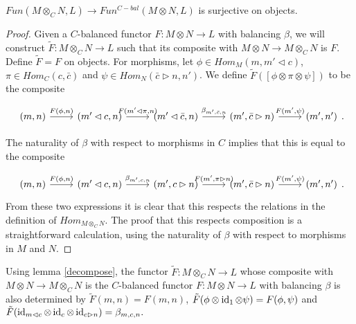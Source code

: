 \begin{lemma}\label{surjective}
  $Fun(M\otimes_C N,L)\to Fun^{C-bal}(M\otimes N,L)$ is surjective on
  objects.
\end{lemma}

\begin{proof}
  Given a $C$-balanced functor $F:M\otimes N \to L$ with balancing $\beta$, we
  will construct $\tilde{F}:M\otimes_C N \to L$ such that its composite with
  $M\otimes N\to M\otimes_C N$ is $F$. Define $\tilde{F} = F$ on objects.
  For morphisms, let $\phi\in Hom_M(m,m'\lhd c)$, $\pi\in Hom_C(c,\bar{c})$
  and $\psi\in Hom_N(\bar{c}\rhd n,n')$. We define
  $\tilde{F}([\phi\otimes\pi\otimes\psi])$ to be the composite

  \[
    \begin{tikzcd}
      {(m,n)} & {(m'\lhd c,n)} & {(m'\lhd \bar{c},n)} & {(m',\bar{c}\rhd n)} & {(m',n')}
      \arrow["{F(\phi,n)}", from=1-1, to=1-2]
      \arrow["{F(m'\lhd\pi,n)}", from=1-2, to=1-3]
      \arrow["{\beta_{m',\bar{c},n}}", from=1-3, to=1-4]
      \arrow["{F(m',\psi)}", from=1-4, to=1-5]
    \end{tikzcd}.
  \]

  \noindent The naturality of $\beta$ with respect to morphisms in $C$ implies
  that this is equal to the composite

  \[
    \begin{tikzcd}
      {(m,n)} & {(m'\lhd c,n)} & {(m', c\rhd n)} & {(m',\bar{c}\rhd n)} & {(m',n')}
      \arrow["{F(\phi,n)}", from=1-1, to=1-2]
      \arrow["{\beta_{m',c,n}}", from=1-2, to=1-3]
      \arrow["{F(m',\pi\rhd n)}", from=1-3, to=1-4]
      \arrow["{F(m',\psi)}", from=1-4, to=1-5]
    \end{tikzcd}.
  \]
  From these two expressions it is clear that this respects the relations in
  the definition of $Hom_{M\otimes_C N}$. The proof that this respects
  composition is a straightforward calculation, using the naturality of
  $\beta$ with respect to morphisms in $M$ and $N$.
  \end{proof}

  \begin{remark}
    Using lemma \ref{decompose}, the functor $\tilde{F}:M\otimes_C N\to L$
    whose composite with $M\otimes N\to M\otimes_C N$ is the $C$-balanced
    functor $F:M\otimes N\to L$ with balancing $\beta$ is also determined by
    $\tilde{F}(m,n)=F(m,n)$,
    $\tilde{F}(\phi\otimes\operatorname{id}_1\otimes\psi)=F(\phi,\psi)$ and
    $\tilde{F}(\operatorname{id}_{m\lhd c}\otimes\operatorname{id}_c\otimes\operatorname{id}_{c\rhd n})=\beta_{m,c,n}.$
  \end{remark}

